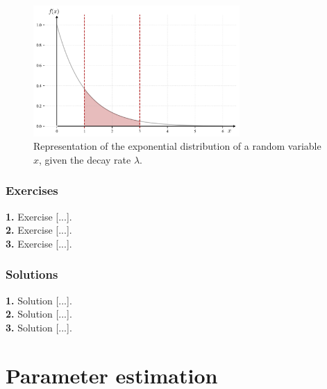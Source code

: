 \documentclass{book}
\begin{document}
\begin{figure}[ht]
    \centering
    \includegraphics[width=0.7\textwidth]{figures/chapter2/exponential_2.png}
    \caption{Representation of the exponential distribution of a random variable $x$, given the decay rate $\lambda$.}
    \label{fig:exponential1}
\end{figure}

\newpage

\subsection*{Exercises}

\textbf{1.} Exercise [...].\\

\textbf{2.} Exercise [...].\\

\textbf{3.} Exercise [...].\\

\newpage

\subsection*{Solutions}

\textbf{1.} Solution [...].\\

\textbf{2.} Solution [...].\\

\textbf{3.} Solution [...].\\




\chapter{Parameter estimation}
\end{document}
